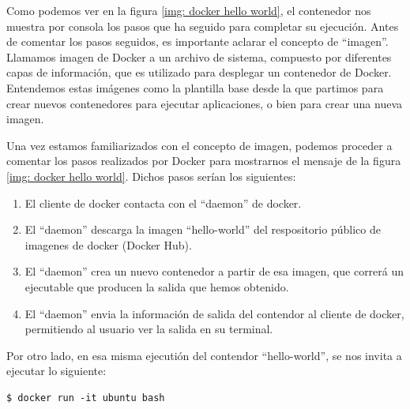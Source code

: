 \documentclass[a4paper, oneside, 12pt]{book}
\begin{document}
	\noindent Como podemos ver en la figura \ref{img: docker hello world}, el contenedor nos muestra por consola los pasos que ha seguido para completar su ejecución. Antes de comentar los pasos seguidos, es importante aclarar el concepto de ``imagen''. \\
	
	\noindent Llamamos imagen de Docker a un archivo de sistema, compuesto por diferentes capas de información, que es utilizado para desplegar un contenedor de Docker. Entendemos estas imágenes como la plantilla base desde la que partimos para crear nuevos contenedores para ejecutar aplicaciones, o bien para crear una nueva imagen.\\
	
	\pagebreak
	
	\noindent Una vez estamos familiarizados con el concepto de imagen, podemos proceder a comentar los pasos realizados por Docker para mostrarnos el mensaje de la figura \ref{img: docker hello world}. Dichos pasos serían los siguientes:
	\begin{enumerate}
		\item El cliente de docker contacta con el ``daemon'' de docker.
		\item El ``daemon'' descarga la imagen  ``hello-world'' del respositorio público de imagenes de docker (Docker Hub).
		\item El ``daemon'' crea un nuevo contenedor a partir de esa imagen, que correrá un ejecutable que producen la salida que hemos obtenido.
		\item El ``daemon'' envia la información de salida del contendor al cliente de docker, permitiendo al usuario ver la salida en su terminal.
	\end{enumerate}

	\noindent Por otro lado, en esa misma ejecutión del contendor ``hello-world'', se nos invita a ejecutar lo siguiente:
	\begin{verbatim}
$ docker run -it ubuntu bash
	\end{verbatim}
\end{document}
